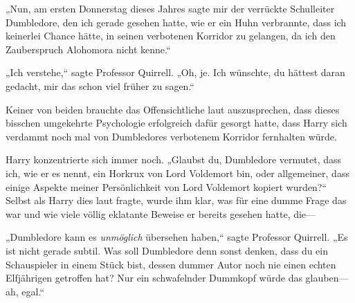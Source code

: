 „Nun, am ersten Donnerstag dieses Jahres sagte mir der verrückte Schulleiter Dumbledore, den ich gerade gesehen hatte, wie er ein Huhn verbrannte, dass ich keinerlei Chance hätte, in seinen verbotenen Korridor zu gelangen, da ich den Zauberspruch Alohomora nicht kenne.“

„Ich verstehe,“ sagte Professor Quirrell. „Oh, je. Ich wünschte, du hättest daran gedacht, mir das schon viel früher zu sagen.“

Keiner von beiden brauchte das Offensichtliche laut auszusprechen, dass dieses bisschen umgekehrte Psychologie erfolgreich dafür gesorgt hatte, dass Harry sich verdammt noch mal von Dumbledores verbotenem Korridor fernhalten würde.

Harry konzentrierte sich immer noch.
„Glaubst du, Dumbledore vermutet, dass ich, wie er es nennt, ein Horkrux von Lord Voldemort bin, oder allgemeiner, dass einige Aspekte meiner Persönlichkeit von Lord Voldemort kopiert wurden?“ Selbst als Harry dies laut fragte, wurde ihm klar, was für eine dumme Frage das war und wie viele völlig eklatante Beweise er bereits gesehen hatte, die—

„Dumbledore kann es \emph{unmöglich} übersehen haben,“ sagte Professor Quirrell. „Es ist nicht gerade subtil. Was soll Dumbledore denn sonst denken, dass du ein Schauspieler in einem Stück bist, dessen dummer Autor noch nie einen echten Elfjährigen getroffen hat? Nur ein schwafelnder Dummkopf würde das glauben—ah, egal.“

